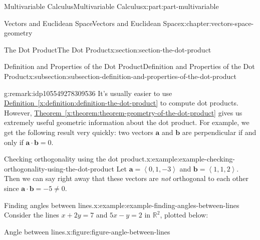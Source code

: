 \documentclass[twoside,10pt,]{book}
\newcommand{\xreffont}{\relax}
\numberwithin{equation}{part}
\newcommand{\RR}{\mathbb{R}}
\newcommand{\dotprod}[1]{\left\langle #1 \right\rangle}
\begin{document}
\begin{partptx}{Multivariable Calculus}{}{Multivariable Calculus}{}{}{x:part:part-multivariable}
\begin{chapterptx}{Vectors and Euclidean Space}{}{Vectors and Euclidean Space}{}{}{x:chapter:vectors-space-geometry}
\begin{sectionptx}{The Dot Product}{}{The Dot Product}{}{}{x:section:section-the-dot-product}
\begin{subsectionptx}{Definition and Properties of the Dot Product}{}{Definition and Properties of the Dot Product}{}{}{x:subsection:subsection-definition-and-properties-of-the-dot-product}
\begin{remark}{}{g:remark:idp105549278309536}
It's usually easier to use \hyperref[x:definition:definition-the-dot-product]{Definition~{\xreffont\ref{x:definition:definition-the-dot-product}}} to compute dot products. However, \hyperref[x:theorem:theorem-geometry-of-the-dot-product]{Theorem~{\xreffont\ref{x:theorem:theorem-geometry-of-the-dot-product}}} gives us extremely useful geometric information about the dot product. For example, we get the following result very quickly: two vectors \(\mathbf{a}\) and \(\mathbf{b}\) are perpendicular if and only if \(\mathbf{a}\cdot\mathbf{b} = 0\).%
\end{remark}
\begin{example}{Checking orthogonality using the dot product.}{x:example:example-checking-orthogonality-using-the-dot-product}%
Let \(\mathbf{a} = \dotprod{0,1,-3}\) and \(\mathbf{b} = \dotprod{1,1,2}.\) Then we can say right away that these vectors are \emph{not} orthogonal to each other since \(\mathbf{a}\cdot\mathbf{b} = -5 \neq 0\).%
\end{example}
\begin{example}{Finding angles between lines.}{x:example:example-finding-angles-between-lines}%
Consider the lines \(x+2y = 7\) and \(5x-y = 2\) in \(\RR^{2}\), plotted below:%
\begin{figureptx}{Angle between lines.}{x:figure:figure-angle-between-lines}{}%
\begin{image}{0.1}{0.8}{0.1}%
\end{image}
\end{figureptx}
\end{example}
\end{subsectionptx}
\end{sectionptx}
\end{chapterptx}
\end{partptx}
\end{document}

